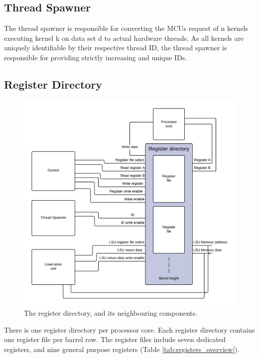 \documentclass[../main/report.tex]{subfiles}
\begin{document}
\subsection{Thread Spawner}

The thread spawner is responsible for converting the MCUs request of n kernels executing kernel k on data set d to actual hardware threads.
As all kernels are uniquely identifiable by their respective thread ID, the thread spawner is responsible for providing strictly increasing and unique IDs.


\subsection{Register Directory}
\begin{figure}[H]
	\centering
	\includegraphics[width=\textwidth]{../gpu/diagrams/register_directory.png}
	\caption{The register directory, and its neighbouring components.}
	\label{fig:register_directory}
\end{figure}

There is one register directory per processor core.
Each register directory contains one register file per barrel row.
The register files include seven dedicated registers, and nine general purpose registers (Table \ref{tab:registers_overview}).
\end{document}
